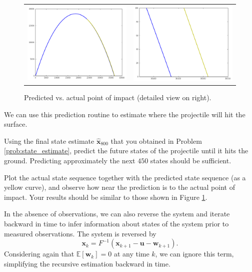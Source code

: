 \begin{figure}
	\centering
	\begin{tabular}{cc}
	\includegraphics[width=.45\textwidth]{impact_macro} &
	\includegraphics[width=.45\textwidth]{impact_micro}
	\end{tabular}
	\caption{Predicted vs. actual point of impact (detailed view on right).}
	\label{fig:impact}
\end{figure}

We can use this prediction routine to estimate where the projectile will hit the surface.
\begin{problem}
Using the final state estimate $\widehat{\mathbf{x}}_{800}$ that you obtained in Problem \ref{prob:state_estimate}, predict the future states of 
the projectile until it hits the ground. 
Predicting approximately the next $450$ states should be sufficient.

Plot the actual state sequence together with the predicted state sequence (as a yellow curve), and observe how near the prediction is to the actual point of impact.
Your results should be similar to those shown in Figure \ref{fig:impact}.
\end{problem}

In the absence of observations, we can also reverse the system and iterate backward in time to infer information about states of the system prior to measured observations.
The system is reversed by
\begin{equation*}
\mathbf{x}_{k} = F^{-1}(\mathbf{x}_{k+1} - \mathbf{u} - \mathbf{w}_{k+1}).
\end{equation*}
Considering again that $\mathbb{E}\left[\mathbf{w}_{k}\right] = 0$ at any time $k$, we can ignore this term, simplifying the recursive estimation backward in time.

